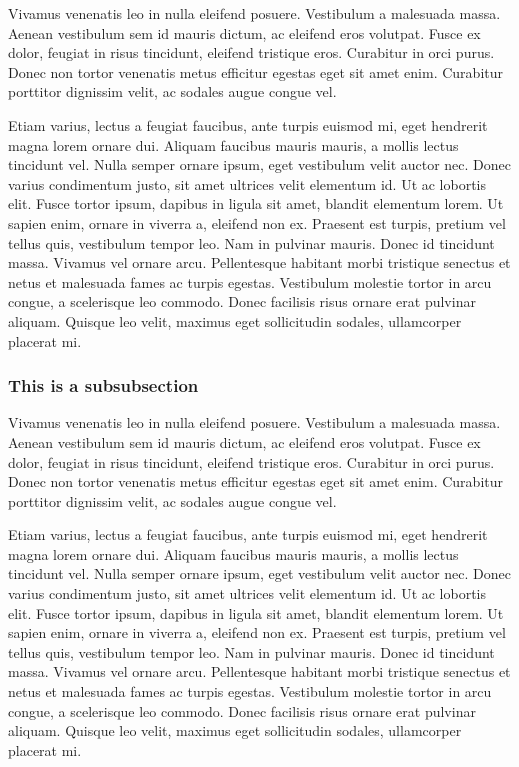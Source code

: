 	Vivamus venenatis leo in nulla eleifend posuere. Vestibulum a malesuada massa. Aenean vestibulum sem id mauris dictum, ac eleifend eros volutpat. Fusce ex dolor, feugiat in risus tincidunt, eleifend tristique eros. Curabitur in orci purus. Donec non tortor venenatis metus efficitur egestas eget sit amet enim. Curabitur porttitor dignissim velit, ac sodales augue congue vel.

	Etiam varius, lectus a feugiat faucibus, ante turpis euismod mi, eget hendrerit magna lorem ornare dui. Aliquam faucibus mauris mauris, a mollis lectus tincidunt vel. Nulla semper ornare ipsum, eget vestibulum velit auctor nec. Donec varius condimentum justo, sit amet ultrices velit elementum id. Ut ac lobortis elit. Fusce tortor ipsum, dapibus in ligula sit amet, blandit elementum lorem. Ut sapien enim, ornare in viverra a, eleifend non ex. Praesent est turpis, pretium vel tellus quis, vestibulum tempor leo. Nam in pulvinar mauris. Donec id tincidunt massa. Vivamus vel ornare arcu. Pellentesque habitant morbi tristique senectus et netus et malesuada fames ac turpis egestas. Vestibulum molestie tortor in arcu congue, a scelerisque leo commodo. Donec facilisis risus ornare erat pulvinar aliquam. Quisque leo velit, maximus eget sollicitudin sodales, ullamcorper placerat mi.

	\subsubsection{This is a subsubsection} \label{sec:third_thing}

	Vivamus venenatis leo in nulla eleifend posuere. Vestibulum a malesuada massa. Aenean vestibulum sem id mauris dictum, ac eleifend eros volutpat. Fusce ex dolor, feugiat in risus tincidunt, eleifend tristique eros. Curabitur in orci purus. Donec non tortor venenatis metus efficitur egestas eget sit amet enim. Curabitur porttitor dignissim velit, ac sodales augue congue vel.

	Etiam varius, lectus a feugiat faucibus, ante turpis euismod mi, eget hendrerit magna lorem ornare dui. Aliquam faucibus mauris mauris, a mollis lectus tincidunt vel. Nulla semper ornare ipsum, eget vestibulum velit auctor nec. Donec varius condimentum justo, sit amet ultrices velit elementum id. Ut ac lobortis elit. Fusce tortor ipsum, dapibus in ligula sit amet, blandit elementum lorem. Ut sapien enim, ornare in viverra a, eleifend non ex. Praesent est turpis, pretium vel tellus quis, vestibulum tempor leo. Nam in pulvinar mauris. Donec id tincidunt massa. Vivamus vel ornare arcu. Pellentesque habitant morbi tristique senectus et netus et malesuada fames ac turpis egestas. Vestibulum molestie tortor in arcu congue, a scelerisque leo commodo. Donec facilisis risus ornare erat pulvinar aliquam. Quisque leo velit, maximus eget sollicitudin sodales, ullamcorper placerat mi.


